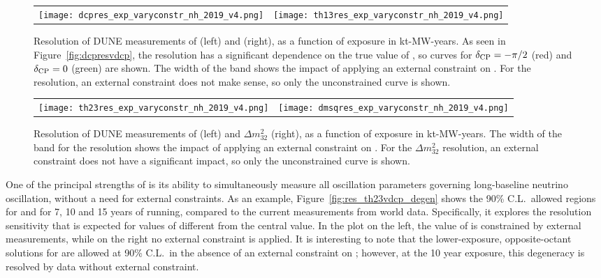 \begin{figure}[h!]
    \centering
    \begin{tabular}{cc}
		\texttt{[image: dcpres\_exp\_varyconstr\_nh\_2019\_v4.png]} &
		\texttt{[image: th13res\_exp\_varyconstr\_nh\_2019\_v4.png]} 
	\end{tabular}  
	\caption[Resolution of DUNE measurements of \deltacp and , as a function of exposure]{Resolution of DUNE measurements of \deltacp (left) and  (right), as a function of exposure in kt-MW-years. As seen in Figure~\ref{fig:dcpresvdcp}, the \deltacp resolution has a significant dependence on the true value of \deltacp, so curves for $\delta_{\rm CP}=-\pi/2$ (red) and $\delta_{\rm CP}=0$ (green) are shown. The width of the band shows the impact of applying an external constraint on . For the  resolution, an external constraint does not make sense, so only the unconstrained curve is shown.}
    \label{fig:appres_exp}
\end{figure}

\begin{figure}[h!]
    \centering
    \begin{tabular}{cc}
		\texttt{[image: th23res\_exp\_varyconstr\_nh\_2019\_v4.png]} &
		\texttt{[image: dmsqres\_exp\_varyconstr\_nh\_2019\_v4.png]} 
	\end{tabular}  
	\caption[Resolution of DUNE measurements of \deltacp and , as a function of exposure]{Resolution of DUNE measurements of  (left) and $\Delta m^{2}_{32}$ (right), as a function of exposure in kt-MW-years. The width of the band for the  resolution shows the impact of applying an external constraint on . For the $\Delta m^{2}_{32}$ resolution, an external constraint does not have a significant impact, so only the unconstrained curve is shown.}
    \label{fig:disres_exp}
\end{figure}

One of the principal strengths of  is its ability to simultaneously measure all oscillation parameters governing long-baseline neutrino oscillation, without a need for external constraints. As an example, Figure~\ref{fig:res_th23vdcp_degen} shows the 90\% C.L.\ allowed regions for  and \deltacp for 7, 10 and 15 years of running, 
compared to the current measurements from world data.
Specifically, it explores the resolution sensitivity that is expected 
for values of  different from the  central value.  In the plot on the 
left, the value of  is constrained by external measurements, while on the right no external constraint is applied.
It is interesting to note that the lower-exposure, opposite-octant solutions for  are allowed at 90\% C.L.\ in the absence of an external constraint on ; however, at the 10 year exposure, this degeneracy is resolved by  data without external constraint.



